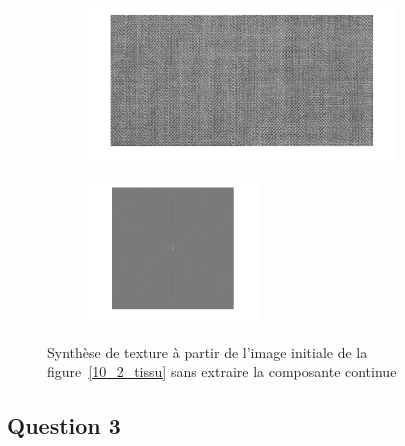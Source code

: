 \documentclass[12pt,a4paper,onecolumn]{article}
\begin{document}
\begin{figure}[H]
	\centering
	\begin{subfigure}[b]{\textwidth}
		\centering
		\includegraphics[width = 0.9\textwidth]{10_2_tissu_aper}
		\label{10_2_aper_image}
	\end{subfigure}
	\begin{subfigure}[b]{\textwidth}
		\centering
		\includegraphics[width = 0.5\textwidth]{10_2_tissu_aper_fft}
		\label{10_2_aper_fft}
	\end{subfigure}
	\caption{Synthèse de texture à partir de l'image initiale de la figure~\ref{10_2_tissu} sans extraire la composante continue}
	\label{10_2_aper}
\end{figure}

\subsection{Question 3}
\end{document}
